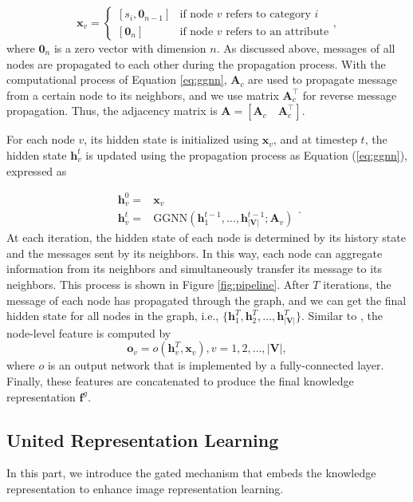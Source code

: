 \documentclass{article}
\begin{document}
\begin{equation}
\mathbf{x}_v=
\begin{cases}
[s_i, \mathbf{0}_{n-1}]& \text{if node $v$ refers to category $i$}\\
[\mathbf{0}_n]& \text{if node $v$ refers to an attribute}
\end{cases},
\end{equation}
where $\mathbf{0}_n$ is a zero vector with dimension $n$. As discussed above, messages of all nodes are propagated to each other during the propagation process. With the computational process of Equation \ref{eq:ggnn}, $\mathbf{A}_c$ are used to propagate message from a certain node to its neighbors, and we use matrix $\mathbf{A}_c^\top$ for reverse message propagation. Thus, the adjacency matrix is $\mathbf{A}=[\mathbf{A}_c \quad \mathbf{A}_c^\top]$.

For each node $v$, its hidden state is initialized using $\mathbf{x}_v$, and at timestep $t$, the hidden state $\mathbf{h}_v^t$ is updated using the propagation process as Equation (\ref{eq:ggnn}),  expressed as

\begin{equation}
   \begin{split}
    \mathbf{h}_v^0=&{}\mathbf{x}_v \\
    \mathbf{h}_v^t=&{}\mathrm{GGNN}(\mathbf{h}_1^{t-1},\dots,\mathbf{h}_{|\mathbf{V}|}^{t-1};\mathbf{A}_v)
   \end{split}.
   \label{eq:upate}
\end{equation}
At each iteration, the hidden state of each node is determined by its history state and the messages sent by its neighbors. In this way, each node can aggregate information from its neighbors and simultaneously transfer its message to its neighbors. This process is shown in Figure \ref{fig:pipeline}. After $T$ iterations, the message of each node has propagated through the graph, and we can get the final hidden state for all nodes in the graph, i.e., $\{\mathbf{h}_1^{T},\mathbf{h}_2^{T},\dots,\mathbf{h}_{|\mathbf{V}|}^{T}\}$. Similar to \cite{li2015gated}, the node-level feature is computed by
\begin{equation}
\mathbf{o}_v=o(\mathbf{h}_v^T, \mathbf{x}_v), v=1,2,\dots,|\mathbf{V}|,
\end{equation} 
where $o$ is an output network that is implemented by a fully-connected layer. Finally, these features are concatenated to produce the final knowledge representation $\mathbf{f}^g$. 

\subsection{United Representation Learning}
In this part, we introduce the gated mechanism that embeds the knowledge representation to enhance image representation learning.
\end{document}

